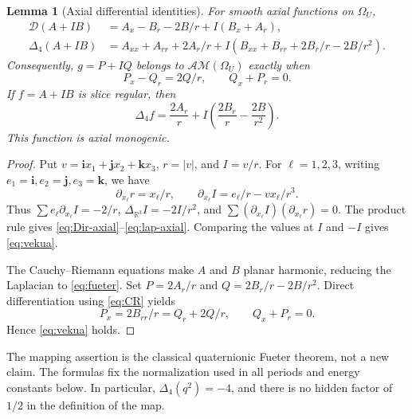 \documentclass[11pt,a4paper]{article}
\numberwithin{equation}{section}
\newtheorem{lemma}[theorem]{Lemma}
\theoremstyle{definition}
\theoremstyle{remark}
\newcommand{\R}{\mathbb R}
\newcommand{\AM}{\mathcal{AM}}
\newcommand{\Fu}{\Delta_4}
\newcommand{\Dir}{\mathcal D}
\newcommand{\ii}{\mathbf i}
\newcommand{\jj}{\mathbf j}
\newcommand{\kk}{\mathbf k}
\begin{document}
\begin{lemma}[Axial differential identities]\label{lem:axial}
For smooth axial functions on $\Omega_U$,
\begin{align}
 \Dir(A+IB)&=A_x-B_r-2B/r+I(B_x+A_r),\label{eq:Dir-axial}\\
 \Fu(A+IB)&=A_{xx}+A_{rr}+2A_r/r
 +I(B_{xx}+B_{rr}+2B_r/r-2B/r^2).\label{eq:lap-axial}
\end{align}
Consequently, $g=P+IQ$ belongs to $\AM(\Omega_U)$ exactly when
\begin{equation}
 P_x-Q_r=2Q/r,\qquad Q_x+P_r=0.\label{eq:vekua}
\end{equation}
If $f=A+IB$ is slice regular, then
\begin{equation}
 \Fu f=\frac{2A_r}{r}
       +I\left(\frac{2B_r}{r}-\frac{2B}{r^2}\right).
 \label{eq:fueter}
\end{equation}
This function is axial monogenic.
\end{lemma}
\begin{proof}
Put $v=\ii x_1+\jj x_2+\kk x_3$, $r=|v|$, and $I=v/r$.
For $\ell=1,2,3$, writing $e_1=\ii,e_2=\jj,e_3=\kk$, we have
\[
 \partial_{x_\ell}r=x_\ell/r,\qquad
 \partial_{x_\ell}I=e_\ell/r-vx_\ell/r^3.
\]
Thus $\sum e_\ell\partial_{x_\ell}I=-2/r$,
$\Delta_{\R^3}I=-2I/r^2$, and
$\sum(\partial_{x_\ell}I)(\partial_{x_\ell}r)=0$.
The product rule gives \eqref{eq:Dir-axial}--\eqref{eq:lap-axial}.
Comparing the values at $I$ and $-I$ gives \eqref{eq:vekua}.

The Cauchy--Riemann equations make $A$ and $B$ planar harmonic, reducing
the Laplacian to \eqref{eq:fueter}. Set
$P=2A_r/r$ and $Q=2B_r/r-2B/r^2$. Direct differentiation using
\eqref{eq:CR} yields
\[
 P_x=2B_{rr}/r=Q_r+2Q/r,\qquad Q_x+P_r=0.
\]
Hence \eqref{eq:vekua} holds.
\end{proof}
The mapping assertion is the classical quaternionic Fueter theorem, not a
new claim. The formulas fix the normalization used in all periods and energy
constants below. In particular, $\Fu(q^2)=-4$, and there is no hidden
factor of $1/2$ in the definition of the map.
\end{document}
